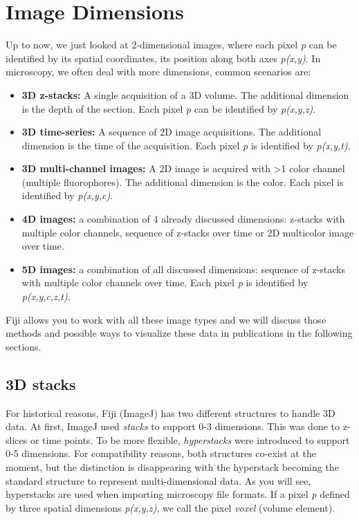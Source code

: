 \section{Image Dimensions}

Up to now, we just looked at 2-dimensional images, where each pixel \emph{p} can be identified by its spatial coordinates, its position along both axes \emph{p(x,y)}. In microscopy, we often deal with more dimensions, common scenarios are:

\begin{itemize}
	\item \textbf{3D z-stacks:} A single acquisition of a 3D volume. The additional dimension is the depth of the section. Each pixel \emph{p} can be identified by \emph{p(x,y,z)}.
	\item \textbf{3D time-series:} A sequence of 2D image acquisitions. The additional dimension is the time of the acquisition. Each pixel \emph{p} is identified by \emph{p(x,y,t)}. 
	\item \textbf{3D multi-channel images:} A 2D image is acquired with >1 color channel (multiple fluorophores). The additional dimension is the color. Each pixel is identified by \emph{p(x,y,c)}.
	\item \textbf{4D images:} a combination of 4 already discussed dimensions: z-stacks with multiple color channels, sequence of z-stacks over time or 2D multicolor image over time.
	\item \textbf{5D images:} a combination of all discussed dimensions: sequence of z-stacks with multiple color channels over time. Each pixel \emph{p} is identified by \emph{p(x,y,c,z,t)}.
\end{itemize}

Fiji allows you to work with all these image types and we will discuss those methods and possible ways to visualize these data in publications in the following sections.

\subsection{3D stacks}

For historical reasons, Fiji (ImageJ) has two different structures to handle 3D data. At first, ImageJ used \emph{stacks} to support 0-3 dimensions. This was done to z-slices or time points. To be more flexible, \emph{hyperstacks} were introduced to support 0-5 dimensions. For compatibility reasons, both structures co-exist at the moment, but the distinction is disappearing with the hyperstack becoming the standard structure to represent multi-dimensional data. As you will see, hyperstacks are used when importing microscopy file formats. If a pixel \emph{p} defined by three spatial dimensions \emph{p(x,y,z)}, we call the pixel \emph{voxel} (volume element).


